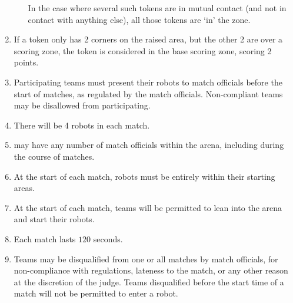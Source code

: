 \begin{enumerate}
\begin{enumerate}
            In the case where several such tokens are in mutual contact (and not in
            contact with anything else), all those tokens are `in' the zone.
    \end{enumerate}
  \item If a token only has 2 corners on the raised area, but the other 2 are over
        a scoring zone, the token is considered in the base scoring zone, scoring 2 points.
  \item Participating teams must present their robots to match officials before
        the start of matches, as regulated by the match officials. Non-compliant
        teams may be disallowed from participating.
  \item There will be 4 robots in each match.
  \item \org may have any number of match officials within the arena, including
        during the course of matches.
  \item At the start of each match, robots must be entirely within their
        starting areas.
  \item At the start of each match, teams will be permitted to lean into the
        arena and start their robots.
  \item Each match lasts $120$ seconds.
  \item Teams may be disqualified from one or all matches by match officials,
        for non-compliance with regulations, lateness to the match, or any other
        reason at the discretion of the judge. Teams disqualified before the
        start time of a match will not be permitted to enter a robot.
\end{enumerate}
